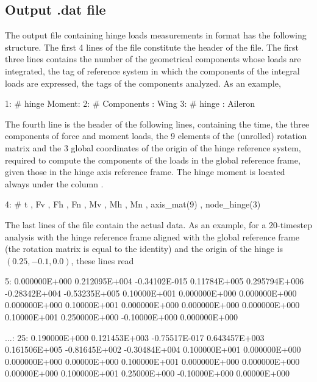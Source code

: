 \subsection{Output .dat file}
The output file containing hinge loads measurements in  
format has the following structure.
The first 4 lines of the file constitute the header of the file. 
The first three lines contains the number of the geometrical components 
 whose loads are integrated, the tag of reference system 
in which the components of the integral loads are expressed, the tags of 
the  components analyzed. As an example,
\begin{inputfile}
 1: # hinge Moment: 
 2: #               Components  : Wing
 3: #                    hinge  : Aileron
\end{inputfile}
The fourth line is the header of the following lines, containing the time, 
the three components of force and moment loads, the 9 elements of the (unrolled) 
rotation matrix and the 3 global coordinates of the origin of the hinge reference 
system, required to compute the components of the loads in the global reference 
frame, given those in the hinge axis reference frame. The hinge moment is located 
always under the column . 
\begin{inputfile}
 4: #  t , Fv , Fh , Fn , Mv , Mh , Mn , axis_mat(9) , node_hinge(3) 
\end{inputfile}
The last lines of the file contain the actual data. As an example, 
for a 20-timestep analysis with the hinge  reference frame  
aligned with the global reference frame (the rotation matrix is equal to the identity)
and the origin of the hinge is $(0.25,-0.1,0.0)$, these lines read
\begin{inputfile}
  5: 0.000000E+000    0.212095E+004    -0.34102E-015  0.11784E+005  
     0.295794E+006    -0.28342E+004    -0.53235E+005  0.10000E+001  
     0.000000E+000    0.000000E+000    0.000000E+000  0.10000E+001  
     0.000000E+000    0.000000E+000    0.000000E+000  0.10000E+001  
     0.250000E+000    -0.10000E+000    0.000000E+000
  
...:
  25: 0.190000E+000  0.121453E+003 -0.75517E-017  0.643457E+003  
      0.161506E+005  -0.81645E+002 -0.30484E+004  0.100000E+001  
      0.000000E+000  0.000000E+000  0.00000E+000  0.100000E+001  
      0.000000E+000  0.000000E+000  0.00000E+000  0.100000E+001  
      0.25000E+000   -0.10000E+000  0.00000E+000
\end{inputfile}



